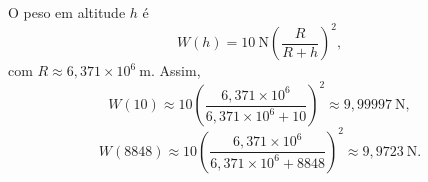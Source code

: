 O peso em altitude $h$ é
\[
W(h)=10\ \text{N}\left(\frac{R}{R+h}\right)^{2},
\]
com $R\approx6{,}371\times10^{6}\ \mathrm{m}$. Assim,
\[
W(10)\approx10\left(\frac{6{,}371\times10^{6}}{6{,}371\times10^{6}+10}\right)^{2}\approx9{,}99997\ \mathrm{N},
\]
\[
W(8848)\approx10\left(\frac{6{,}371\times10^{6}}{6{,}371\times10^{6}+8848}\right)^{2}\approx9{,}9723\ \mathrm{N}.
\]